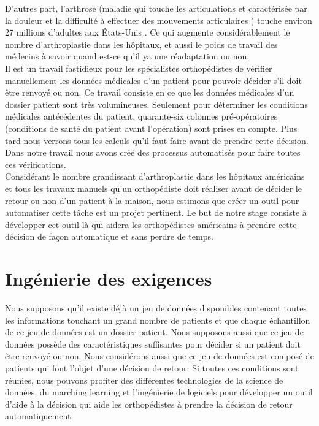 \documentclass[12pt, french]{report}
\begin{document}
D'autres part, l'arthrose (maladie qui touche les articulations et caractérisée par la douleur et la difficulté à effectuer des mouvements articulaires \cite{key12}) touche environ 27 millions d'adultes aux États-Unis \cite{key11}.  Ce qui augmente considérablement le nombre d'arthroplastie dans les hôpitaux, et aussi le poids de travail des médecins à savoir quand est-ce qu'il ya une réadaptation ou non.\\

Il est un travail fastidieux pour les spécialistes orthopédistes de vérifier manuellement les données médicales d'un patient pour pouvoir décider s'il doit être renvoyé ou non. Ce travail consiste en ce que les données médicales d'un dossier patient sont très volumineuses. Seulement pour déterminer les conditions médicales antécédentes du patient, quarante-six colonnes pré-opératoires (conditions de santé du patient avant l'opération) sont prises en compte. Plus tard nous verrons tous les calculs qu'il faut faire avant de prendre cette décision. Dans notre travail nous avons créé des processus automatisés pour faire toutes ces vérifications.  \\

Considérant le nombre grandissant d'arthroplastie dans les hôpitaux américains et tous les travaux manuels qu'un orthopédiste doit réaliser avant de décider le retour ou non d'un patient à la maison, nous estimons que créer un outil pour automatiser cette tâche est un projet pertinent. Le but de notre stage consiste à développer cet outil-là qui aidera les orthopédistes américains à prendre cette décision de façon automatique et sans perdre de temps.  \\

\section{Ingénierie des exigences}

Nous supposons qu'il existe déjà un jeu de données disponibles contenant toutes les informations touchant un grand nombre de patients et que chaque échantillon de ce jeu de données est un dossier patient. Nous supposons aussi que ce jeu de données possède des caractéristiques suffisantes pour décider si un patient doit être renvoyé ou non. Nous considérons aussi que ce jeu de données est composé de patients qui font l'objet d'une décision de retour. Si toutes ces conditions sont réunies, nous pouvons profiter des différentes technologies de la science de données, du marching learning et l'ingénierie de logiciels pour développer un outil d'aide à la décision qui aide les orthopédistes à prendre la décision de retour automatiquement. \\
\end{document}

